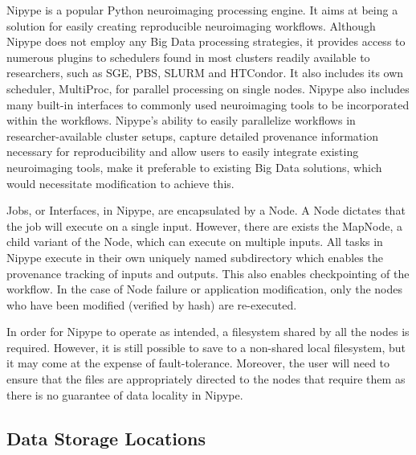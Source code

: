 \documentclass{IEEEtran}
\begin{document}
Nipype is a popular Python neuroimaging processing engine. It aims at being a 
solution for easily creating reproducible neuroimaging workflows. Although Nipype
does not employ any Big Data processing strategies, it provides access to numerous
plugins to schedulers found in most clusters readily available to researchers, 
such as SGE, PBS, SLURM and HTCondor. It also includes its own scheduler, MultiProc,
for parallel processing on single nodes. Nipype also includes many built-in 
interfaces to commonly used neuroimaging tools to be incorporated within the 
workflows. Nipype's ability to easily parallelize workflows in researcher-available 
cluster setups, capture detailed provenance information necessary for reproducibility
and allow users to easily integrate existing neuroimaging tools, make it preferable
to existing Big Data solutions, which would necessitate modification to achieve this.

Jobs, or Interfaces, in Nipype, are encapsulated by a Node. A Node dictates that
the job will execute on a single input. However, there are exists the MapNode, 
a child variant of the Node, which can execute on multiple inputs. All tasks in
Nipype execute in their own uniquely named subdirectory which enables the provenance 
tracking of inputs and outputs. This also enables checkpointing of the workflow.
In the case of Node failure or application modification, only the nodes who have
been modified (verified by hash) are re-executed.

In order for Nipype to operate as intended, a filesystem shared by all the nodes 
is required. However, it is still possible to save to a non-shared local filesystem, 
but it may come at the expense of fault-tolerance. Moreover, the user will need to
ensure that the files are appropriately directed to the nodes that require them as
there is no guarantee of data locality in Nipype.



\subsection{Data Storage Locations}
\end{document}

